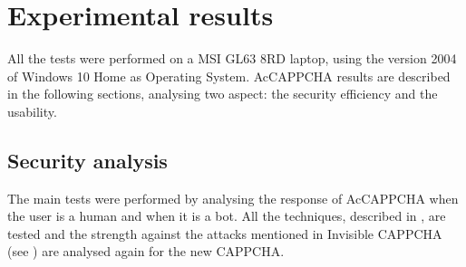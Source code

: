 \chapter{Experimental results}\label{chapter:Results}
All the tests were performed on a MSI GL63 8RD laptop, using the version 2004 of Windows 10 Home as Operating System. AcCAPPCHA results are described in the following sections, analysing two aspect: the security efficiency and the usability.

\section{Security analysis}
The main tests were performed by analysing the response of AcCAPPCHA when the user is a human and when it is a bot. All the techniques, described in , are tested and the strength against the attacks mentioned in Invisible CAPPCHA (see ) are analysed again for the new CAPPCHA.  

